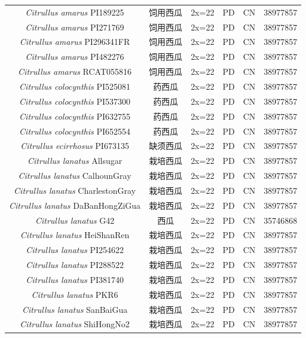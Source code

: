 {{\begin{longtable}{cccccc}
    \textit{Citrullus amarus} PI189225 & 饲用西瓜 & 2x=22 & PD & CN & 38977857 \\
    \textit{Citrullus amarus} PI271769 & 饲用西瓜 & 2x=22 & PD & CN & 38977857 \\
    \textit{Citrullus amarus} PI296341FR & 饲用西瓜 & 2x=22 & PD & CN & 38977857 \\
    \textit{Citrullus amarus} PI482276 & 饲用西瓜 & 2x=22 & PD & CN & 38977857 \\
    \textit{Citrullus amarus} RCAT055816 & 饲用西瓜 & 2x=22 & PD & CN & 38977857 \\
    \textit{Citrullus colocynthis} PI525081 & 药西瓜 & 2x=22 & PD & CN & 38977857 \\
    \textit{Citrullus colocynthis} PI537300 & 药西瓜 & 2x=22 & PD & CN & 38977857 \\
    \textit{Citrullus colocynthis} PI632755 & 药西瓜 & 2x=22 & PD & CN & 38977857 \\
    \textit{Citrullus colocynthis} PI652554 & 药西瓜 & 2x=22 & PD & CN & 38977857 \\
    \textit{Citrullus ecirrhosus} PI673135 & 缺须西瓜 & 2x=22 & PD & CN & 38977857 \\
    \textit{Citrullus lanatus} Allsugar & 栽培西瓜 & 2x=22 & PD & CN & 38977857 \\
    \textit{Citrullus lanatus} CalhounGray & 栽培西瓜 & 2x=22 & PD & CN & 38977857 \\
    \textit{Citrullus lanatus} CharlestonGray & 栽培西瓜 & 2x=22 & PD & CN & 38977857 \\
    \textit{Citrullus lanatus} DaBanHongZiGua & 栽培西瓜 & 2x=22 & PD & CN & 38977857 \\
    \textit{Citrullus lanatus} G42 & 西瓜 & 2x=22 & PD & CN & 35746868 \\
    \textit{Citrullus lanatus} HeiShanRen & 栽培西瓜 & 2x=22 & PD & CN & 38977857 \\
    \textit{Citrullus lanatus} PI254622 & 栽培西瓜 & 2x=22 & PD & CN & 38977857 \\
    \textit{Citrullus lanatus} PI288522 & 栽培西瓜 & 2x=22 & PD & CN & 38977857 \\
    \textit{Citrullus lanatus} PI381740 & 栽培西瓜 & 2x=22 & PD & CN & 38977857 \\
    \textit{Citrullus lanatus} PKR6 & 栽培西瓜 & 2x=22 & PD & CN & 38977857 \\
    \textit{Citrullus lanatus} SanBaiGua & 栽培西瓜 & 2x=22 & PD & CN & 38977857 \\
    \textit{Citrullus lanatus} ShiHongNo2 & 栽培西瓜 & 2x=22 & PD & CN & 38977857 \\

\end{longtable}}}
